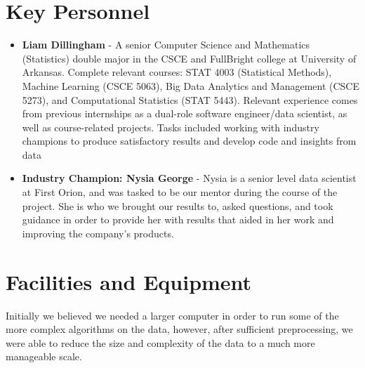 \documentclass[20pt]{article} %
\begin{document}
\section{Key Personnel} 
\begin{itemize}
\item \textbf{Liam Dillingham} - A senior Computer Science and Mathematics (Statistics) double major in the CSCE and FullBright college at University of Arkansas.  Complete relevant courses: STAT 4003 (Statistical Methods), Machine Learning (CSCE 5063), Big Data Analytics and Management (CSCE 5273), and Computational Statistics (STAT 5443).  Relevant experience comes from previous internships as a dual-role software engineer/data scientist, as well as course-related projects.  Tasks included working with industry champions to produce satisfactory results and develop code and insights from data

\item \textbf{Industry Champion: Nysia George} - Nysia is a senior level data scientist at First Orion, and was tasked to be our mentor during the course of the project.  She is who we brought our results to, asked questions, and took guidance in order to provide her with results that aided in her work and improving the company's products.
\end{itemize}

\section{Facilities and Equipment}
Initially we believed we needed a larger computer in order to run some of the more complex algorithms on the data, however, after sufficient preprocessing, we were able to reduce the size and complexity of the data to a much more manageable scale.
\end{document}
